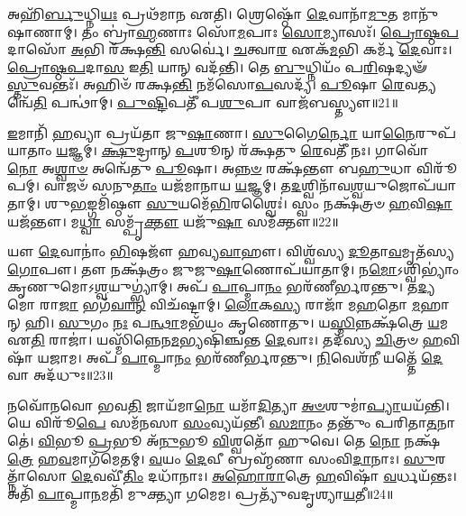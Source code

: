 𑌅𑌹𑌿᳴\-\ul{𑌰𑍍𑌬𑍁}\-𑌧𑍍𑌨𑌿\-\ul{𑌯𑌃} 𑌪𑍍𑌰𑌥᳴𑌮𑌾𑌨 𑌏𑌤𑌿।
𑌶𑍍𑌰𑍇𑌷𑍍𑌠𑍋᳴ \ul{𑌦𑍇}\-𑌵𑌾𑌨𑌾᳴\-\ul{𑌮𑍁}\-𑌤 𑌮𑌾𑌨𑍁᳴𑌷𑌾𑌣𑌾𑌮𑍍।
𑌤𑌂 𑌬𑍍𑌰𑌾॑\-\ul{𑌹𑍍𑌮}\-𑌣𑌾𑌃 𑌸𑍋᳴\-\ul{𑌮}\-𑌪𑌾𑌃 \ul{𑌸𑍋}\-𑌮𑍍𑌯𑌾𑌸𑌃᳴।
\-\ul{𑌪𑍍𑌰𑍋}\-\-\ul{𑌷𑍍𑌠}\-\-\ul{𑌪}\-𑌦𑌾𑌸𑍋᳴ \ul{𑌅}\-𑌭𑌿 𑌰᳴𑌕𑍍𑌷\-\ul{𑌨𑍍𑌤𑌿} 𑌸𑌰𑍍𑌵𑍇॑।
\-\ul{𑌚}\-𑌤𑍍𑌵𑌾\-\ul{𑌰} 𑌏𑌕᳴\-\ul{𑌮}\-𑌭𑌿 𑌕𑌰𑍍𑌮᳴ \ul{𑌦𑍇}\-𑌵𑌾𑌃।
\-\ul{𑌪𑍍𑌰𑍋}\-\-\ul{𑌷𑍍𑌠}\-\-\ul{𑌪}\-𑌦𑌾\-\ul{𑌸} 𑌇\-\ul{𑌤𑌿} 𑌯𑌾𑌨𑍍 𑌵𑌦᳴𑌨𑍍𑌤𑌿।
𑌤𑍇 \ul{𑌬𑍁}\-𑌧𑍍𑌨𑌿𑌯𑌂᳴ 𑌪\-\ul{𑌰𑌿}\-𑌷𑌦𑍍𑌯𑍟᳴ \ul{𑌸𑍍𑌤𑍁}\-𑌵𑌨𑍍𑌤𑌃᳴।
𑌅𑌹𑌿𑍞᳴ 𑌰𑌕𑍍𑌷\-\ul{𑌨𑍍𑌤𑌿} 𑌨𑌮᳴𑌸𑍋\-\ul{𑌪}\-𑌸𑌦𑍍𑌯᳴।
\-\ul{𑌪𑍂}\-𑌷𑌾 \ul{𑌰𑍇}\-𑌵𑌤𑍍𑌯𑌨𑍍𑌵𑍇᳴\-\ul{𑌤𑌿} 𑌪𑌨𑍍𑌥𑌾॑𑌮𑍍।
\-\ul{𑌪𑍁}\-\-\ul{𑌷𑍍𑌟𑌿}\-𑌪𑌤𑍀᳴ 𑌪\-\ul{𑌶𑍁}\-𑌪𑌾 𑌵𑌾𑌜᳴𑌬𑌸𑍍𑌤𑍍𑌯𑍗॥21॥

\-\ul{𑌇}\-𑌮𑌾𑌨𑌿᳴ \ul{𑌹}\-𑌵𑍍𑌯𑌾 𑌪𑍍𑌰𑌯᳴𑌤𑌾 𑌜𑍁\-\ul{𑌷𑌾}\-𑌣𑌾।
\-\ul{𑌸𑍁}\-𑌗𑍈\-\ul{𑌰𑍍𑌨𑍋} 𑌯𑌾\-\ul{𑌨𑍈}\-𑌰𑍁𑌪᳴𑌯𑌾𑌤𑌾𑌂 \ul{𑌯}\-𑌜𑍍𑌞𑌮𑍍।
\-\ul{𑌕𑍍𑌷𑍁}\-𑌦𑍍𑌰𑌾𑌨𑍍 \ul{𑌪}\-𑌶𑍂𑌨𑍍 𑌰᳴𑌕𑍍𑌷𑌤𑍁 \ul{𑌰𑍇}\-𑌵𑌤𑍀᳴ 𑌨𑌃।
𑌗𑌾𑌵𑍋᳴ \ul{𑌨𑍋} 𑌅\-\ul{𑌶𑍍𑌵𑌾}\-\-\ul{𑍞} 𑌅𑌨𑍍𑌵𑍇᳴𑌤𑍁 \ul{𑌪𑍂}\-𑌷𑌾।
𑌅\-\ul{𑌨𑍍𑌨}\-\-\ul{𑍞} 𑌰𑌕𑍍𑌷᳴𑌨𑍍𑌤𑍗 𑌬\-\ul{𑌹𑍁}\-𑌧𑌾 𑌵𑌿𑌰𑍂᳴𑌪𑌮𑍍।
𑌵𑌾𑌜𑍞᳴ 𑌸𑌨𑍁\-\ul{𑌤𑌾𑌂} 𑌯𑌜᳴𑌮𑌾𑌨𑌾𑌯 \ul{𑌯}\-𑌜𑍍𑌞𑌮𑍍।
𑌤\-\ul{𑌦}\-𑌶𑍍𑌵𑌿𑌨𑌾᳴𑌵\-\ul{𑌶𑍍𑌵}\-𑌯𑍁𑌜𑍋𑌪᳴𑌯𑌾𑌤𑌾𑌮𑍍।
𑌶𑍁\-\ul{𑌭}\-𑌙𑍍𑌗𑌮𑌿᳴𑌷𑍍𑌠𑍗 \ul{𑌸𑍁}\-𑌯𑌮𑍇᳴\-\ul{𑌭𑌿}\-𑌰𑌶𑍍𑌵𑍈𑌃॑।
𑌸𑍍𑌵𑌂 𑌨𑌕𑍍𑌷᳴𑌤𑍍𑌰𑍞 \ul{𑌹}\-𑌵𑌿\-\ul{𑌷𑌾} 𑌯𑌜᳴𑌨𑍍𑌤𑍗।
𑌮\-\ul{𑌧𑍍𑌵𑌾} 𑌸𑌮𑍍𑌪𑍃᳴\-\ul{𑌕𑍍𑌤𑍗} 𑌯𑌜𑍁᳴\-\ul{𑌷𑌾} 𑌸𑌮᳴𑌕𑍍𑌤𑍗॥22॥

𑌯𑍗 \ul{𑌦𑍇}\-𑌵𑌾𑌨𑌾𑌂॑ \ul{𑌭𑌿}\-𑌷𑌜𑍗᳴ 𑌹𑌵𑍍𑌯\-\ul{𑌵𑌾}\-𑌹𑍗।
𑌵𑌿𑌶𑍍𑌵᳴𑌸𑍍𑌯 \ul{𑌦𑍂}\-𑌤𑌾\-\ul{𑌵}\-𑌮𑍃𑌤᳴𑌸𑍍𑌯 \ul{𑌗𑍋}\-𑌪𑍗।
𑌤𑍗 𑌨𑌕𑍍𑌷᳴𑌤𑍍𑌰𑌂 𑌜𑍁𑌜𑍁\-\ul{𑌷𑌾}\-𑌣𑍋𑌪᳴𑌯𑌾𑌤𑌾𑌮𑍍।
𑌨\-\ul{𑌮𑍋}\-𑌽𑌶𑍍𑌵𑌿𑌭𑍍𑌯𑌾𑌂॑ 𑌕𑍃𑌣𑍁𑌮𑍋\-𑌽\-\ul{𑌶𑍍𑌵}\-𑌯𑍁𑌗𑍍𑌭𑍍𑌯𑌾॑𑌮𑍍।
𑌅𑌪᳴ \ul{𑌪𑌾}\-𑌪𑍍𑌮𑌾\-\ul{𑌨𑌂} 𑌭𑌰᳴𑌣𑍀𑌰𑍍𑌭𑌰𑌨𑍍𑌤𑍁।
𑌤\-\ul{𑌦𑍍𑌯}\-𑌮𑍋 𑌰𑌾\-\ul{𑌜𑌾} 𑌭𑌗᳴\-\ul{𑌵𑌾}\-\-\ul{𑌨𑍍} 𑌵𑌿𑌚᳴𑌷𑍍𑌟𑌾𑌮𑍍।
\-\ul{𑌲𑍋}\-𑌕\-\ul{𑌸𑍍𑌯} 𑌰𑌾𑌜𑌾᳴ 𑌮\-\ul{𑌹}\-𑌤𑍋 \ul{𑌮}\-𑌹𑌾𑌨𑍍 𑌹𑌿।
\-\ul{𑌸𑍁}\-𑌗𑌂 \ul{𑌨𑌃} 𑌪\-\ul{𑌨𑍍𑌥𑌾}\-𑌮𑌭᳴𑌯𑌂 𑌕𑍃𑌣𑍋𑌤𑍁।
𑌯\-\ul{𑌸𑍍𑌮𑌿}\-𑌨𑍍𑌨𑌕𑍍𑌷᳴𑌤𑍍𑌰𑍇 \ul{𑌯}\-𑌮 𑌏\-\ul{𑌤𑌿} 𑌰𑌾𑌜𑌾॑।
𑌯𑌸𑍍𑌮𑌿᳴𑌨𑍍𑌨𑍇𑌨\-\ul{𑌮}\-𑌭𑍍𑌯𑌷𑌿᳴𑌞𑍍𑌚𑌨𑍍𑌤 \ul{𑌦𑍇}\-𑌵𑌾𑌃।
𑌤𑌦᳴𑌸𑍍𑌯 \ul{𑌚𑌿}\-𑌤𑍍𑌰𑍞 \ul{𑌹}\-𑌵𑌿𑌷𑌾᳴ 𑌯𑌜𑌾𑌮।
𑌅𑌪᳴ \ul{𑌪𑌾}\-𑌪𑍍𑌮𑌾\-\ul{𑌨𑌂} 𑌭𑌰᳴𑌣𑍀𑌰𑍍𑌭𑌰𑌨𑍍𑌤𑍁।
\-\ul{𑌨𑌿}\-𑌵𑍇𑌶᳴\-\ul{𑌨𑍀} 𑌯𑌤𑍍𑌤𑍇᳴ \ul{𑌦𑍇}\-𑌵𑌾 𑌅𑌦᳴𑌧𑍁𑌃॥23॥\anuvakamend[\-\ul{𑌤}\-𑌤𑌾\-\ul{𑌰} 𑌮𑌹𑍍𑌯𑌂᳴ 𑌪𑍍𑌰𑌾\-\ul{𑌸}\-𑌚𑍀𑌰𑍍𑌯𑌾 𑌯𑌾॑𑌨𑍍𑌤𑍁 \ul{𑌯}\-𑌜𑍍𑌞𑌂 𑌵𑌾𑌚𑍟᳴ \ul{𑌸𑍍𑌵}\-𑌸𑍍𑌤𑌿 \ul{𑌦𑍇}\-𑌵𑌾 𑌅𑌨𑍁᳴𑌯\-\ul{𑌨𑍍𑌤𑌿} 𑌸\-\ul{𑌰𑍍𑌵𑍇} 𑌵𑌾𑌜᳴𑌬\-\ul{𑌸𑍍𑌤𑍍𑌯𑍗} 𑌸𑌮᳴𑌕𑍍𑌤𑍗 \ul{𑌦𑍇}\-𑌵𑌾𑌸𑍍𑌤𑍍𑌰𑍀𑌣𑌿᳴ 𑌚]

𑌨𑌵𑍋᳴𑌨𑌵𑍋 𑌭𑌵\-\ul{𑌤𑌿} 𑌜𑌾𑌯᳴𑌮𑌾\-\ul{𑌨𑍋} 𑌯𑌮𑌾᳴\-\ul{𑌦𑌿}\-𑌤𑍍𑌯𑌾 \ul{𑌅}\-\-\ul{𑍞}\-𑌶𑍁𑌮𑌾॑\-\ul{𑌪𑍍𑌯𑌾}\-𑌯𑌯᳴𑌨𑍍𑌤𑌿।
𑌯𑍇 𑌵𑌿𑌰𑍂᳴\-\ul{𑌪𑍇} 𑌸𑌮᳴𑌨𑌸𑌾 \ul{𑌸𑌂}\-𑌵𑍍𑌯𑌯᳴𑌨𑍍𑌤𑍀।
\-\ul{𑌸}\-\-\ul{𑌮𑌾}\-𑌨𑌂 𑌤𑌨𑍍𑌤𑍁𑌂᳴ 𑌪𑌰𑌿𑌤𑌾\-\ul{𑌤}\-𑌨𑌾 𑌤𑍇॑।
\-\ul{𑌵𑌿}\-𑌭𑍂 \ul{𑌪𑍍𑌰}\-𑌭𑍂 𑌅᳴\-\ul{𑌨𑍁}\-𑌭𑍂 \ul{𑌵𑌿}\-𑌶𑍍𑌵𑌤𑍋᳴ 𑌹𑍁𑌵𑍇।
𑌤𑍇 \ul{𑌨𑍋} 𑌨𑌕𑍍𑌷᳴\-\ul{𑌤𑍍𑌰𑍇} 𑌹\-\ul{𑌵}\-𑌮𑌾𑌗᳴𑌮𑍇𑌤𑌮𑍍।
\-\ul{𑌵}\-𑌯𑌂 \ul{𑌦𑍇}\-𑌵𑍀 𑌬𑍍𑌰𑌹𑍍𑌮᳴𑌣𑌾 𑌸𑌂𑌵𑌿\-\ul{𑌦𑌾}\-𑌨𑌾𑌃।
\-\ul{𑌸𑍁}\-𑌰𑌤𑍍𑌨𑌾᳴𑌸𑍋 \ul{𑌦𑍇}\-𑌵𑌵𑍀᳴\-\ul{𑌤𑌿𑌂} 𑌦𑌧𑌾᳴𑌨𑌾𑌃।
\-\ul{𑌅}\-\-\ul{𑌹𑍋}\-\-\ul{𑌰𑌾}\-𑌤𑍍𑌰𑍇 \ul{𑌹}\-𑌵𑌿𑌷𑌾᳴ \ul{𑌵}\-𑌰𑍍𑌧𑌯᳴𑌨𑍍𑌤𑌃।
𑌅𑌤𑌿᳴ \ul{𑌪𑌾}\-𑌪𑍍𑌮𑌾\-\ul{𑌨}\-𑌮𑌤𑌿᳴ 𑌮𑍁𑌕𑍍𑌤𑍍𑌯𑌾 𑌗𑌮𑍇𑌮।
𑌪𑍍𑌰𑌤𑍍𑌯𑍁᳴𑌵𑌦𑍃𑌶𑍍𑌯𑌾\-\ul{𑌯}\-𑌤𑍀॥24॥

